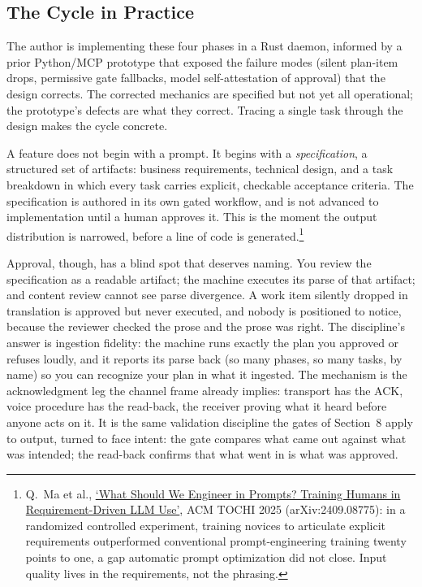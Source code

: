 \documentclass[11pt, a4paper]{article}
\begin{document}
\subsection{The Cycle in Practice}

The author is implementing these four phases in a Rust daemon,
informed by a prior Python/MCP prototype that exposed the failure modes (silent plan-item
drops, permissive gate fallbacks, model self-attestation of approval) that the design
corrects. The corrected mechanics are specified but not yet all operational; the
prototype's defects are what they correct. Tracing a single task through the design makes
the cycle concrete.

A feature does not begin with a prompt. It begins with a \emph{specification}, a structured
set of artifacts: business requirements, technical design, and a task breakdown in which
every task carries explicit, checkable acceptance criteria. The specification is authored
in its own gated workflow, and is not advanced to implementation until a human approves it.
This is the moment the output distribution is narrowed, before a line of code is
generated.\footnote{Q.~Ma et al., \href{https://arxiv.org/abs/2409.08775}{`What Should We
Engineer in Prompts? Training Humans in Requirement-Driven LLM Use'}, ACM TOCHI 2025
(arXiv:2409.08775): in a randomized controlled experiment, training novices to articulate
explicit requirements outperformed conventional prompt-engineering training twenty points
to one, a gap automatic prompt optimization did not close. Input quality lives in the
requirements, not the phrasing.}

Approval, though, has a blind spot that deserves naming. You review the specification as
a readable artifact; the machine executes its parse of that artifact; and content review
cannot see parse divergence. A work item silently dropped in translation is approved but
never executed, and nobody is positioned to notice, because the reviewer checked the
prose and the prose was right. The discipline's answer is ingestion fidelity: the
machine runs exactly the plan you approved or refuses loudly, and it reports its parse
back (so many phases, so many tasks, by name) so you can recognize your plan in what it
ingested. The mechanism is the acknowledgment leg the channel frame already implies:
transport has the ACK, voice procedure has the read-back, the receiver proving what it
heard before anyone acts on it. It is the same validation discipline the gates of
Section~8 apply to output, turned to face intent: the gate compares what came out
against what was intended; the read-back confirms that what went in is what was
approved.
\end{document}
